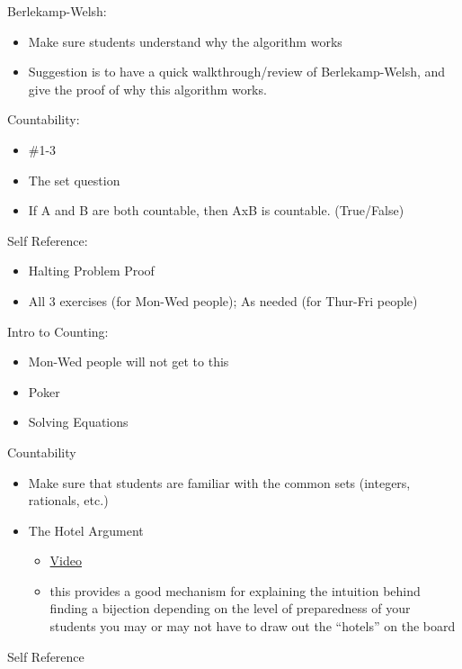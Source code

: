 \documentclass{exam}
\begin{document}
\begin{questions}
\item Berlekamp-Welsh: 
\begin{itemize}
\item Make sure students understand why the algorithm works
\item Suggestion is to have a quick walkthrough/review of Berlekamp-Welsh, and give the proof of why this algorithm works.
\end{itemize}
\item Countability: 
\begin{itemize}
\item \#1-3 
\item The set question
\item If A and B are both countable, then AxB is countable. (True/False)
\end{itemize}
\item Self Reference: 
\begin{itemize}
\item Halting Problem Proof
\item All 3 exercises (for Mon-Wed people); As needed (for Thur-Fri people)
\end{itemize}
\item Intro to Counting: 
\begin{itemize}
\item Mon-Wed people will not get to this
\item Poker
\item Solving Equations
\end{itemize}
\item Countability
\begin{itemize}
\item Make sure that students are familiar with the common sets (integers, rationals, etc.)
\item The Hotel Argument 
\begin{itemize}
\item \href{https://www.youtube.com/watch?v=6NlwpEArfwk&list=PL-XXv-cvA_iD8wQm8U0gG_Z1uHjImKXFy&index=13}{Video}
\item this provides a good mechanism for explaining the intuition behind finding a bijection
depending on the level of preparedness of your students you may or may not have to draw out the “hotels” on the board
\end{itemize}
\end{itemize}
\item Self Reference
\begin{itemize}

\end{itemize}
\end{questions}
\end{document}
